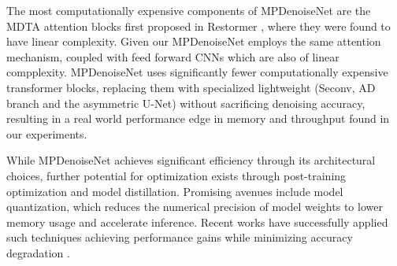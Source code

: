 The most computationally expensive components of MPDenoiseNet are the MDTA attention blocks first proposed in Restormer \cite{Zamir2022}, where they were found to have linear complexity. Given our MPDenoiseNet employs the same attention mechanism, coupled with feed forward CNNs which are also of linear compplexity. MPDenoiseNet uses significantly fewer computationally expensive transformer blocks, replacing them with specialized lightweight (Seconv, AD branch and the asymmetric U-Net) without sacrificing denoising accuracy, resulting in a real world performance edge in memory and throughput found in our experiments.

While MPDenoiseNet achieves significant efficiency through its architectural choices, further potential for optimization exists through post-training optimization and model distillation. Promising avenues include model quantization, which reduces the numerical precision of model weights to lower memory usage and accelerate inference. Recent works have successfully applied such techniques achieving performance gains while minimizing accuracy degradation \cite{Qin2025, Zhu2024}.